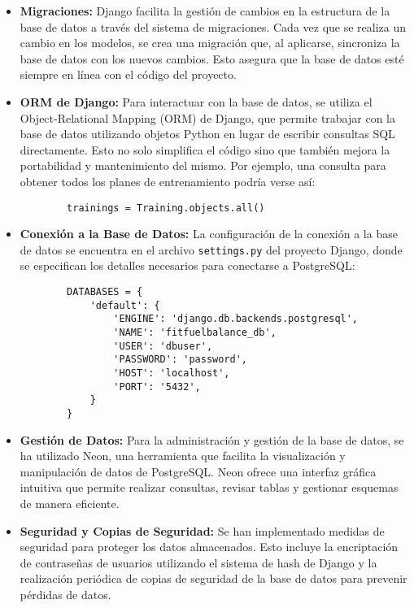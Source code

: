\begin{itemize}
    \item \textbf{Migraciones:} Django facilita la gestión de cambios en la estructura de la base de datos a través del sistema de migraciones. Cada vez que se realiza un cambio en los modelos, se crea una migración que, al aplicarse, sincroniza la base de datos con los nuevos cambios. Esto asegura que la base de datos esté siempre en línea con el código del proyecto.

    \item \textbf{ORM de Django:} Para interactuar con la base de datos, se utiliza el Object-Relational Mapping (ORM) de Django, que permite trabajar con la base de datos utilizando objetos Python en lugar de escribir consultas SQL directamente. Esto no solo simplifica el código sino que también mejora la portabilidad y mantenimiento del mismo. Por ejemplo, una consulta para obtener todos los planes de entrenamiento podría verse así:
    \begin{verbatim}
        trainings = Training.objects.all()
    \end{verbatim}

    \item \textbf{Conexión a la Base de Datos:} La configuración de la conexión a la base de datos se encuentra en el archivo \texttt{settings.py} del proyecto Django, donde se especifican los detalles necesarios para conectarse a PostgreSQL:
    \begin{verbatim}
        DATABASES = {
            'default': {
                'ENGINE': 'django.db.backends.postgresql',
                'NAME': 'fitfuelbalance_db',
                'USER': 'dbuser',
                'PASSWORD': 'password',
                'HOST': 'localhost',
                'PORT': '5432',
            }
        }
    \end{verbatim}

    \item \textbf{Gestión de Datos:} Para la administración y gestión de la base de datos, se ha utilizado Neon, una herramienta que facilita la visualización y manipulación de datos de PostgreSQL. Neon ofrece una interfaz gráfica intuitiva que permite realizar consultas, revisar tablas y gestionar esquemas de manera eficiente.

    \item \textbf{Seguridad y Copias de Seguridad:} Se han implementado medidas de seguridad para proteger los datos almacenados. Esto incluye la encriptación de contraseñas de usuarios utilizando el sistema de hash de Django y la realización periódica de copias de seguridad de la base de datos para prevenir pérdidas de datos.
\end{itemize}